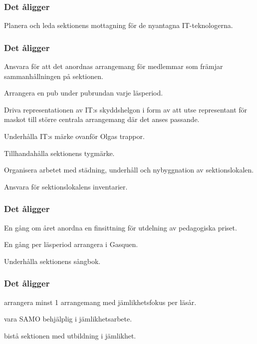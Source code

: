\subsubsection{Det åligger \NOLLKIT}
\begin{att}
	\item Planera och leda sektionens mottagning för de nyantagna IT-teknologerna.
\end{att}

\subsubsection{Det åligger \PRIT}
\begin{att}
	\item Ansvara för att det anordnas arrangemang för medlemmar som främjar sammanhållningen på sektionen.
	\item Arrangera en pub under pubrundan varje läsperiod.
	\item Driva representationen av IT:s skyddshelgon i form av att utse representant för maskot till större centrala arrangemang där det anses passande.
	\item Underhålla IT:s märke ovanför Olgas trappor.
	\item Tillhandahålla sektionens tygmärke.
	\item Organisera arbetet med städning, underhåll och nybyggnation av sektionslokalen.
	\item Ansvara för sektionslokalens inventarier.
\end{att}

\subsubsection{Det åligger \SEXIT}
\begin{att}
	\item En gång om året anordna en finsittning för utdelning av pedagogiska priset.
	\item En gång per läsperiod arrangera i Gasquen.
	\item Underhålla sektionens sångbok. 
\end{att}

\subsubsection{Det åligger \EQUALIT{}}
\begin{att}
    \item arrangera minst 1 arrangemang med jämlikhetsfokus per läsår.
    \item vara SAMO behjälplig i jämlikhetsarbete.
    \item bistå sektionen med utbildning i jämlikhet.
\end{att}

